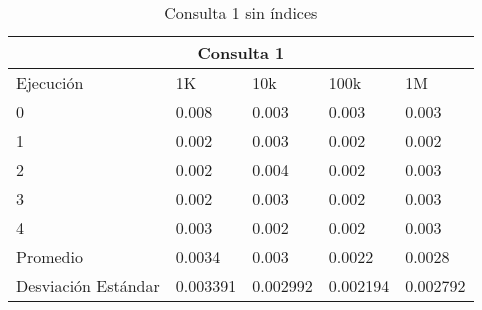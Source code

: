 \begin{table}%
\begin{center}%
\setlength{\tabcolsep}{1in}%
\begin{tabular}{|l|l|l|l|l|}%
\hline%
\multicolumn{5}{|c|}{Consulta 1}\\%
\hline%
Ejecución&1K&10k&100k&1M\\%
\hline%
0&0.008&0.003&0.003&0.003\\%
\hline%
1&0.002&0.003&0.002&0.002\\%
\hline%
2&0.002&0.004&0.002&0.003\\%
\hline%
3&0.002&0.003&0.002&0.003\\%
\hline%
4&0.003&0.002&0.002&0.003\\%
\hline%
Promedio&0.0034&0.003&0.0022&0.0028\\%
\hline%
Desviación Estándar&0.003391&0.002992&0.002194&0.002792\\%
\hline%
\end{tabular}%
\end{center}%
\caption{Consulta 1 sin índices}%
\end{table}